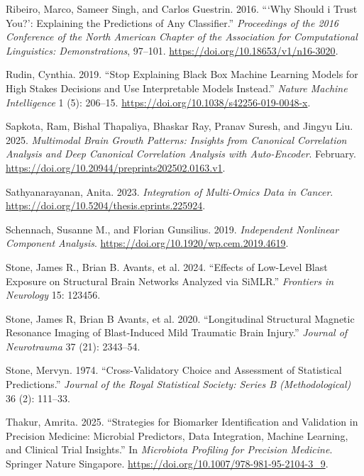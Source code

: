 \documentclass[
  letterpaper,
]{report}
\newlength{\cslhangindent}
\newenvironment{CSLReferences}[2] %
 {\begin{list}{}{%
  \setlength{\itemindent}{0pt}
  \setlength{\leftmargin}{0pt}
  \setlength{\parsep}{0pt}
  \ifodd #1
   \setlength{\leftmargin}{\cslhangindent}
   \setlength{\itemindent}{-1\cslhangindent}
  \fi
  \setlength{\itemsep}{#2\baselineskip}}}
 {\end{list}}
\begin{document}
\begin{CSLReferences}{1}{1}
Ribeiro, Marco, Sameer Singh, and Carlos Guestrin. 2016. {``{`Why Should
i Trust You?'}: Explaining the Predictions of Any Classifier.''}
\emph{Proceedings of the 2016 Conference of the North American Chapter
of the Association for Computational Linguistics: Demonstrations},
97--101. \url{https://doi.org/10.18653/v1/n16-3020}.

Rudin, Cynthia. 2019. {``Stop Explaining Black Box Machine Learning
Models for High Stakes Decisions and Use Interpretable Models
Instead.''} \emph{Nature Machine Intelligence} 1 (5): 206--15.
\url{https://doi.org/10.1038/s42256-019-0048-x}.

Sapkota, Ram, Bishal Thapaliya, Bhaskar Ray, Pranav Suresh, and Jingyu
Liu. 2025. \emph{Multimodal Brain Growth Patterns: Insights from
Canonical Correlation Analysis and Deep Canonical Correlation Analysis
with Auto-Encoder}. February.
\url{https://doi.org/10.20944/preprints202502.0163.v1}.

Sathyanarayanan, Anita. 2023. \emph{Integration of Multi-Omics Data in
Cancer}. \url{https://doi.org/10.5204/thesis.eprints.225924}.

Schennach, Susanne M., and Florian Gunsilius. 2019. \emph{Independent
Nonlinear Component Analysis}.
\url{https://doi.org/10.1920/wp.cem.2019.4619}.

{Stone, James R., Brian B. Avants, et al.} 2024. {``Effects of Low-Level
Blast Exposure on Structural Brain Networks Analyzed via SiMLR.''}
\emph{Frontiers in Neurology} 15: 123456.

{Stone, James R, Brian B Avants, et al.} 2020. {``Longitudinal
Structural Magnetic Resonance Imaging of Blast-Induced Mild Traumatic
Brain Injury.''} \emph{Journal of Neurotrauma} 37 (21): 2343--54.

Stone, Mervyn. 1974. {``Cross-Validatory Choice and Assessment of
Statistical Predictions.''} \emph{Journal of the Royal Statistical
Society: Series B (Methodological)} 36 (2): 111--33.

Thakur, Amrita. 2025. {``Strategies for Biomarker Identification and
Validation in Precision Medicine: Microbial Predictors, Data
Integration, Machine Learning, and Clinical Trial Insights.''} In
\emph{Microbiota Profiling for Precision Medicine}. Springer Nature
Singapore. \url{https://doi.org/10.1007/978-981-95-2104-3_9}.


\end{CSLReferences}
\end{document}
